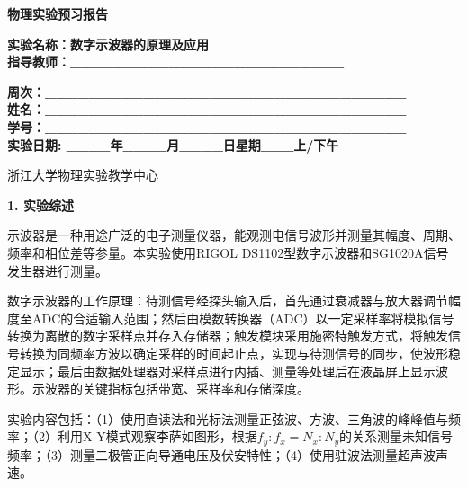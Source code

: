 \documentclass[a4paper,12pt]{article}
\begin{document}
\begin{center}
    \vspace*{2cm}
    {\fontsize{36pt}{43pt}\selectfont \textbf{物理实验预习报告}}
    \vspace{3cm}
\end{center}

\begin{center}
    \fontsize{16pt}{24pt}\selectfont
    \textbf{实验名称：数字示波器的原理及应用\quad} \\[0.5em]
    \textbf{指导教师：\_\_\_\_\_\_\_\_\_\_\_\_\_\_\_\_\_\_\_\_\_\_\_\_\_}
\end{center}

\vspace{2cm}

\begin{center}
    \fontsize{14pt}{28pt}\selectfont
    \textbf{周次：\_\_\_\_\_\_\_\_\_\_\_\_\_\_\_\_\_\_\_\_\_\_\_\_\_\_\_\_\_\_\_\_\_} \\
    \textbf{姓名：\_\_\_\_\_\_\_\_\_\_\_\_\_\_\_\_\_\_\_\_\_\_\_\_\_\_\_\_\_\_\_\_\_} \\
    \textbf{学号：\_\_\_\_\_\_\_\_\_\_\_\_\_\_\_\_\_\_\_\_\_\_\_\_\_\_\_\_\_\_\_\_\_} \\[0.5em]
    \textbf{实验日期: \_\_\_\_年\_\_\_\_月\_\_\_\_日\quad 星期\_\_\_上/下午}
\end{center}

\vspace{1.5cm}

\begin{center}
    \fontsize{14pt}{20pt}\selectfont
    浙江大学物理实验教学中心
\end{center}

\newpage


{\fontsize{14pt}{20pt}\selectfont \textbf{1. 实验综述}}

\vspace{0.3cm}

{\fontsize{12pt}{18pt}\selectfont

示波器是一种用途广泛的电子测量仪器，能观测电信号波形并测量其幅度、周期、频率和相位差等参量。本实验使用RIGOL DS1102型数字示波器和SG1020A信号发生器进行测量。

数字示波器的工作原理：待测信号经探头输入后，首先通过衰减器与放大器调节幅度至ADC的合适输入范围；然后由模数转换器（ADC）以一定采样率将模拟信号转换为离散的数字采样点并存入存储器；触发模块采用施密特触发方式，将触发信号转换为同频率方波以确定采样的时间起止点，实现与待测信号的同步，使波形稳定显示；最后由数据处理器对采样点进行内插、测量等处理后在液晶屏上显示波形。示波器的关键指标包括带宽、采样率和存储深度。

实验内容包括：（1）使用直读法和光标法测量正弦波、方波、三角波的峰峰值与频率；（2）利用X-Y模式观察李萨如图形，根据$f_y : f_x = N_x : N_y$的关系测量未知信号频率；（3）测量二极管正向导通电压及伏安特性；（4）使用驻波法测量超声波声速。

}
\end{document}

